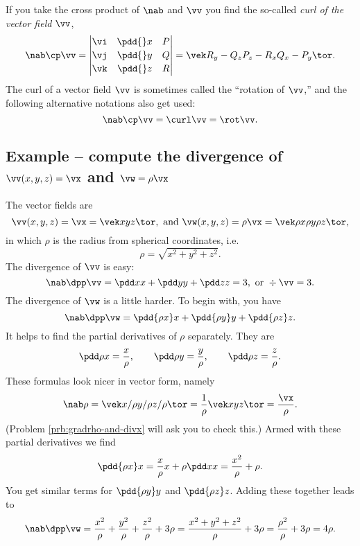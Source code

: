 If you take the cross product of $\nab$ and $\vv$ you find the so-called
\emph{curl of the vector field} $\vv$,
\[
\nab \cp \vv =
\left|
  \begin{matrix}
    \vi & \pdd{}x & P \\[2pt]
    \vj & \pdd{}y & Q \\[2pt]
    \vk & \pdd{}z & R
  \end{matrix}
  \right|
  =\vek R_y - Q_z\\ P_z - R_x \\ Q_x - P_y\tor.
\]
The curl of a vector field $\vv$ is sometimes called the ``rotation of
$\vv$,'' and the following alternative notations also get used:
\[
\nab \cp \vv = \curl \vv = \rot \vv.
\]

\subsection{Example -- compute the divergence of $\vv(x, y, z) = \vx$ and  
  $\vw = \rho\vx$}
\label{sec:divx-and-divrhox}
The vector fields are
\[
\vv(x, y, z) = \vx = \vek x\\y\\z\tor,
\text{ and }
\vw(x, y, z) = \rho\vx = \vek \rho x\\\rho y \\ \rho z\tor,
\]
in which $\rho$ is the radius from spherical coordinates, i.e.
\[
\rho = \sqrt{x^2+y^2+z^2}.
\]
The divergence of $\vv$ is easy:
\[
\nab\dpp\vv = \pdd xx + \pdd yy + \pdd zz = 3, \text{ or } \div \vv =3.
\]
The divergence of $\vw$ is a little harder.   To begin with, you have
\[
\nab\dpp\vw = \pdd{\rho x}x + \pdd{\rho y}y + \pdd{\rho z}z.
\]
It helps to find the partial derivatives of $\rho$ separately.   They are
\[
\pdd \rho x = \frac{x} {\rho},\qquad
\pdd \rho y = \frac{y} {\rho},\qquad
\pdd \rho z = \frac{z} {\rho}.
\]
These formulas look nicer in vector form, namely
\begin{equation}\label{eq:05gradient-of-rho}
  \nab \rho = \vek x/\rho\\y/\rho\\z/\rho\tor
  =\frac{1} {\rho}\vek x\\y\\z\tor = \frac{\vx} {\rho}.
\end{equation}
(Problem \ref{prb:gradrho-and-divx} will ask you to check this.)  Armed
with these partial derivatives we find
\[
\pdd{\rho x}x = \frac{x} {\rho}x + \rho \pdd xx = \frac{x^2} {\rho} + \rho.
\]
You get similar terms for $\pdd{\rho y}y$ and $\pdd{\rho z}z$.   Adding
these together leads to
\[
\nab\dpp\vw
= \frac{x^2} {\rho} +\frac{y^2} {\rho} +\frac{z^2} {\rho} +3\rho
= \frac{x^2 + y^2 + z^2} {\rho} +3\rho
= \frac{\rho^2} {\rho} + 3\rho
= 4\rho.
\]

